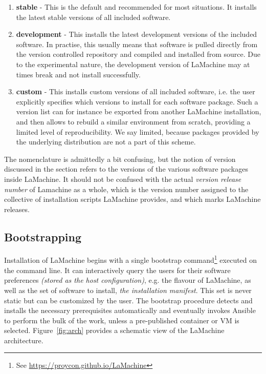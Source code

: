 \documentclass[a4paper,11pt]{article}
\begin{document}
\begin{enumerate}
    \item \textbf{stable} - This is the default and recommended for most situations. It installs the latest stable
        versions of all included software.
    \item \textbf{development} - This installs the latest development versions of the included software. In practise, this usually means that software is pulled directly from the version controlled repository and compiled and installed from source. Due to the experimental nature, the development version of
        LaMachine may at times break and not install successfully.
    \item \textbf{custom} - This installs custom versions of all included software, i.e. the user explicitly
        specifies which versions to install for each software package.  Such a version list can for instance be exported
        from another LaMachine installation, and then allows to rebuild a similar environment from scratch, providing a
        limited level of reproducibility. We say limited, because packages
        provided by the underlying distribution are not a part of this scheme.
\end{enumerate}

The nomenclature is admittedly a bit confusing, but the notion of version discussed in the section refers to the
versions of the various software packages inside LaMachine. It should not be
confused with the actual \emph{version release number} of Lamachine as a whole, which is the version number assigned to
the collective of installation scripts LaMachine provides, and which marks LaMachine releases.

\subsection{Bootstrapping}

Installation of LaMachine begins with a single bootstrap command\footnote{See \url{https://proycon.github.io/LaMachine}}
executed on the command line.  It can interactively query the users for their software preferences \emph{(stored as the
host configuration)}, e.g. the flavour of LaMachine, as well as the set of software to install, \emph{the installation
manifest}. This set is never static but can be customized by the user. The bootstrap procedure detects and installs the
necessary prerequisites automatically and eventually invokes Ansible to perform the bulk of the work, unless a
pre-published container or VM is selected.  Figure~\ref{fig:arch} provides a schematic view of the LaMachine
architecture.
\end{document}
